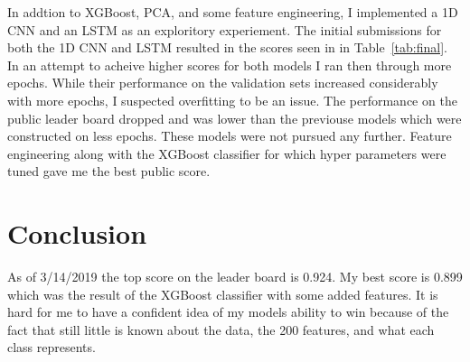 \documentclass[11pt,letterpaper]{article}
\begin{document}
\begin{table}[h!]
\centering
\caption{Final public results}
\label{tab:final}
\end{table}

In addtion to XGBoost, PCA, and some feature engineering, I implemented a 1D CNN
and an LSTM as an exploritory experiement.  The initial submissions for both the
1D CNN and LSTM resulted in the scores seen in in Table~\ref{tab:final}.  In an
attempt to acheive higher scores for both models I ran then through more epochs.
While their performance on the validation sets increased considerably with more
epochs, I suspected overfitting to be an issue.  The performance on the public
leader board dropped and was lower than the previouse models which were
constructed on less epochs.  These models were not pursued any further.  Feature
engineering along with the XGBoost classifier for which hyper parameters were
tuned gave me the best public score.

\section{Conclusion}

As of 3/14/2019 the top score on the leader board is 0.924.  My best score is
0.899 which was the result of the XGBoost classifier with some added features.
It is hard for me to have a confident idea of my models ability to win because
of the fact that still little is known about the data, the 200 features, and
what each class represents.%
\end{document}
